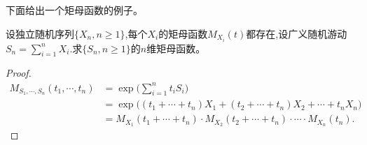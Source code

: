 \documentclass[lang=cn,10pt]{elegantbook}
\begin{document}
	下面给出一个矩母函数的例子。
	\begin{example}
		设独立随机序列\(\{X_n,n\ge 1\}\),每个\(X_i\)的矩母函数\(M_{X_i}(t)\)都存在,设广义随机游动\(S_n=\sum_{i=1}^{n}X_i\).求\(\{S_n,n\ge 1\}\)的\(n\)维矩母函数。
	\end{example}
\begin{proof}
\begin{align*}
M_{S_1,\cdots,S_n}(t_1,\cdots,t_n) 
  &= \exp\!\Big( \sum_{i=1}^{n} t_i S_i \Big) \\
  &= \exp\!\Big( (t_1+\cdots+t_n)X_1 
               + (t_2+\cdots+t_n)X_2 
               + \cdots + t_n X_n \Big) \\
  &= M_{X_1}(t_1+\cdots+t_n)\cdot
     M_{X_2}(t_2+\cdots+t_n)\cdot
     \cdots \cdot
     M_{X_n}(t_n).
\end{align*}
\end{proof}
\end{document}
